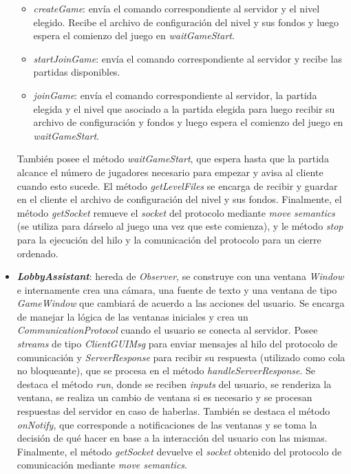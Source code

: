 \begin{itemize}
\begin{itemize}
		\item \textit{createGame}: envía el comando correspondiente al servidor y el nivel elegido. Recibe el archivo de configuración del nivel y sus fondos y luego espera el comienzo del juego en \textit{waitGameStart}.
		
		\item \textit{startJoinGame}: envía el comando correspondiente al servidor y recibe las partidas disponibles.
		
		\item \textit{joinGame}: envía el comando correspondiente al servidor, la partida elegida y el nivel que asociado a la partida elegida para luego recibir su archivo de configuración y fondos y luego espera el comienzo del juego en \textit{waitGameStart}.
	\end{itemize}
	También posee el método \textit{waitGameStart}, que espera hasta que la partida alcance el número de jugadores necesario para empezar y avisa al cliente cuando esto sucede. El método \textit{getLevelFiles} se encarga de recibir y guardar en el cliente el archivo de configuración del nivel y sus fondos. Finalmente, el método \textit{getSocket} remueve el \textit{socket} del protocolo mediante \textit{move semantics} (se utiliza para dárselo al juego una vez que este comienza), y le método \textit{stop} para la ejecución del hilo y la comunicación del protocolo para un cierre ordenado.
	
	\item \textbf{\textit{LobbyAssistant}}: hereda de \textit{Observer}, se construye con una ventana \textit{Window} e internamente crea una cámara, una fuente de texto y una ventana de tipo \textit{GameWindow} que cambiará de acuerdo a las acciones del usuario. Se encarga de manejar la lógica de las ventanas iniciales y crea un \textit{CommunicationProtocol} cuando el usuario se conecta al servidor. Posee \textit{streams} de tipo \textit{ClientGUIMsg} para enviar mensajes al hilo del protocolo de comunicación y \textit{ServerResponse} para recibir su respuesta (utilizado como cola no bloqueante), que se procesa en el método \textit{handleServerResponse}. Se destaca el método \textit{run}, donde se reciben \textit{inputs} del usuario, se renderiza la ventana, se realiza un cambio de ventana si es necesario y se procesan respuestas del servidor en caso de haberlas. También se destaca el método \textit{onNotify}, que corresponde a notificaciones de las ventanas y se toma la decisión de qué hacer en base a la interacción del usuario con las mismas. Finalmente, el método \textit{getSocket} devuelve el \textit{socket} obtenido del protocolo de comunicación mediante \textit{move semantics}.
	

\end{itemize}
